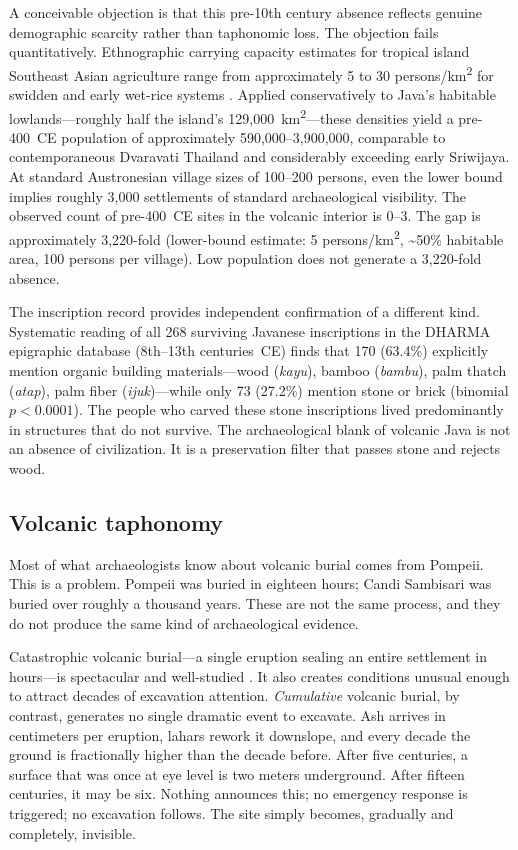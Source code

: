 \documentclass[egqsj, manuscript]{copernicus}
\begin{document}
A conceivable objection is that this pre-10th century absence reflects genuine demographic scarcity rather than taphonomic loss. The objection fails quantitatively. Ethnographic carrying capacity estimates for tropical island Southeast Asian agriculture range from approximately 5 to 30 persons/km\textsuperscript{2} for swidden and early wet-rice systems \citep{bellwood2017,kirch2000,baylisssmith1980}. Applied conservatively to Java's habitable lowlands---roughly half the island's 129,000~km\textsuperscript{2}---these densities yield a pre-400~CE population of approximately 590,000--3,900,000, comparable to contemporaneous Dvaravati Thailand and considerably exceeding early Sriwijaya. At standard Austronesian village sizes of 100--200 persons, even the lower bound implies roughly 3,000 settlements of standard archaeological visibility. The observed count of pre-400~CE sites in the volcanic interior is 0--3. The gap is approximately 3,220-fold (lower-bound estimate: 5 persons/km\textsuperscript{2}, \textasciitilde50\% habitable area, 100 persons per village). Low population does not generate a 3,220-fold absence.

The inscription record provides independent confirmation of a different kind. Systematic reading of all 268 surviving Javanese inscriptions in the DHARMA epigraphic database (8th--13th centuries~CE) \citep{dharma2024} finds that 170 (63.4\%) explicitly mention organic building materials---wood (\textit{kayu}), bamboo (\textit{bambu}), palm thatch (\textit{atap}), palm fiber (\textit{ijuk})---while only 73 (27.2\%) mention stone or brick (binomial $p < 0.0001$). The people who carved these stone inscriptions lived predominantly in structures that do not survive. The archaeological blank of volcanic Java is not an absence of civilization. It is a preservation filter that passes stone and rejects wood.

\subsection{Volcanic taphonomy}

Most of what archaeologists know about volcanic burial comes from Pompeii. This is a problem. Pompeii was buried in eighteen hours; Candi Sambisari was buried over roughly a thousand years. These are not the same process, and they do not produce the same kind of archaeological evidence.

Catastrophic volcanic burial---a single eruption sealing an entire settlement in hours---is spectacular and well-studied \citep{sigurdsson1985,doumas1983,sheets1992}. It also creates conditions unusual enough to attract decades of excavation attention. \textit{Cumulative} volcanic burial, by contrast, generates no single dramatic event to excavate. Ash arrives in centimeters per eruption, lahars rework it downslope, and every decade the ground is fractionally higher than the decade before. After five centuries, a surface that was once at eye level is two meters underground. After fifteen centuries, it may be six. Nothing announces this; no emergency response is triggered; no excavation follows. The site simply becomes, gradually and completely, invisible.
\end{document}

